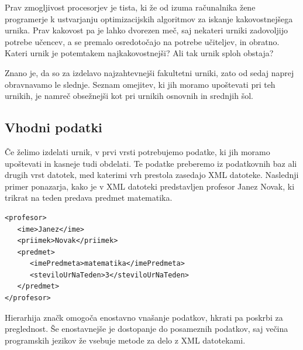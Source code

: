 \documentclass[a4paper, 10pt]{article}
\begin{document}
Prav zmogljivost procesorjev je tista, ki že od izuma računalnika žene programerje k
ustvarjanju optimizacijskih algoritmov za iskanje kakovostnejšega urnika. Prav kakovost
pa je lahko dvorezen meč, saj nekateri urniki zadovoljijo potrebe učencev, a se premalo
osredotočajo na potrebe učiteljev, in obratno. Kateri urnik je potemtakem najkakovostnejši?
Ali tak urnik sploh obstaja?

Znano je, da so za izdelavo najzahtevnejši fakultetni urniki, zato od sedaj naprej
obravnavamo le slednje. Seznam omejitev, ki jih moramo upoštevati pri teh urnikih,
je namreč obsežnejši kot pri urnikih osnovnih in srednjih šol.

\subsection{Vhodni podatki}

Če želimo izdelati urnik, v prvi vrsti potrebujemo podatke, ki jih moramo upoštevati in
kasneje tudi obdelati. Te podatke preberemo iz podatkovnih baz ali drugih vrst datotek,
med katerimi vrh prestola zasedajo XML datoteke. Naslednji primer ponazarja, kako je v
XML datoteki predstavljen profesor Janez Novak, ki trikrat na teden predava predmet
matematika.


\begin{verbatim}
<profesor>
   <ime>Janez</ime>
   <priimek>Novak</priimek>
   <predmet>
      <imePredmeta>matematika</imePredmeta>
      <steviloUrNaTeden>3</steviloUrNaTeden>
   </predmet>
</profesor>
\end{verbatim}

\noindent Hierarhija značk omogoča enostavno vnašanje podatkov, hkrati pa poskrbi za preglednost.
Še enostavnejše je dostopanje do posameznih podatkov, saj večina programskih jezikov že
vsebuje metode za delo z XML datotekami.
\end{document}
